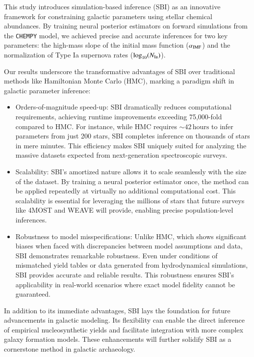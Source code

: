 \documentclass{aa}
\begin{document}
This study introduces simulation-based inference (SBI) as an innovative framework for constraining galactic parameters using stellar chemical abundances. By training neural posterior estimators on forward simulations from the \texttt{CHEMPY} model, we achieved precise and accurate inferences for two key parameters: the high-mass slope of the initial mass function ($\alpha_{\rm IMF}$) and the normalization of Type Ia supernova rates ($\log_{10}(N_{\rm Ia})$).

Our results underscore the transformative advantages of SBI over traditional methods like Hamiltonian Monte Carlo (HMC), marking a paradigm shift in galactic parameter inference:
\begin{itemize}
    \item Orders-of-magnitude speed-up: SBI dramatically reduces computational requirements, achieving runtime improvements exceeding 75,000-fold compared to HMC. For instance, while HMC requires $\sim 42\,\mathrm{hours}$ to infer parameters from just 200 stars, SBI completes inference on thousands of stars in mere minutes. This efficiency makes SBI uniquely suited for analyzing the massive datasets expected from next-generation spectroscopic surveys.
    \item Scalability: SBI's amortized nature allows it to scale seamlessly with the size of the dataset. By training a neural posterior estimator once, the method can be applied repeatedly at virtually no additional computational cost. This scalability is essential for leveraging the millions of stars that future surveys like 4MOST \citep{4most} and WEAVE \citep{weave} will provide, enabling precise population-level inferences.
    \item Robustness to model misspecifications: Unlike HMC, which shows significant biases when faced with discrepancies between model assumptions and data, SBI demonstrates remarkable robustness. Even under conditions of mismatched yield tables or data generated from hydrodynamical simulations, SBI provides accurate and reliable results. This robustness ensures SBI's applicability in real-world scenarios where exact model fidelity cannot be guaranteed.
\end{itemize}

In addition to its immediate advantages, SBI lays the foundation for future advancements in galactic modeling. Its flexibility can enable the direct inference of empirical nucleosynthetic yields and facilitate integration with more complex galaxy formation models. These enhancements will further solidify SBI as a cornerstone method in galactic archaeology.
\end{document}
